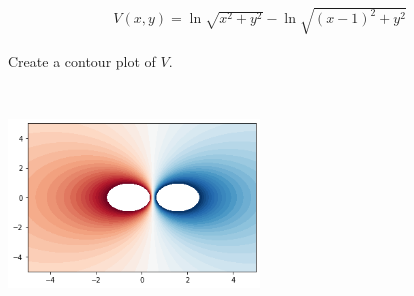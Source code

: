 \begin{align*}
    V(x, y) = \ln{\sqrt{x^2+y^2}} - \ln{\sqrt{(x-1)^2+y^2}}
\end{align*}

Create a contour plot of $V$.

\begin{solution} \
\begin{center}
    \includegraphics[width=0.5\textwidth]{img/e10p1.png}
\end{center}
\end{solution}